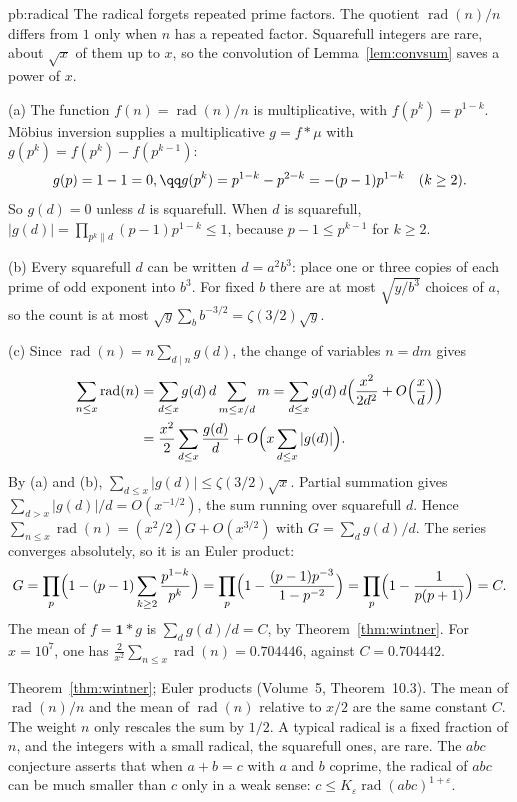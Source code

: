 \begin{solution}{pb:radical}
\idea The radical forgets repeated prime factors. The quotient $\operatorname{rad}(n)/n$ differs from $1$ only when $n$ has a repeated factor. Squarefull integers are rare, about $\sqrt x$ of them up to $x$, so the convolution of Lemma~\ref{lem:convsum} saves a power of $x$.

\writeup (a) The function $f(n)=\operatorname{rad}(n)/n$ is multiplicative, with $f(p^k)=p^{1-k}$. Möbius inversion supplies a multiplicative $g=f*\mu$ with $g(p^k)=f(p^k)-f(p^{k-1})$:
\[
g(p)=1-1=0,\qq g(p^k)=p^{1-k}-p^{2-k}=-(p-1)p^{1-k}\quad(k\ge2).
\]
So $g(d)=0$ unless $d$ is squarefull. When $d$ is squarefull, $|g(d)|=\prod_{p^k\parallel d}(p-1)p^{1-k}\le1$, because $p-1\le p^{k-1}$ for $k\ge2$.

(b) Every squarefull $d$ can be written $d=a^2b^3$: place one or three copies of each prime of odd exponent into $b^3$. For fixed $b$ there are at most $\sqrt{y/b^3}$ choices of $a$, so the count is at most $\sqrt y\sum_b b^{-3/2}=\zeta(3/2)\sqrt y$.

(c) Since $\operatorname{rad}(n)=n\sum_{d\mid n}g(d)$, the change of variables $n=dm$ gives
\[
\begin{aligned}\sum_{n\le x}\operatorname{rad}(n)&=\sum_{d\le x}g(d)\,d\sum_{m\le x/d}m=\sum_{d\le x}g(d)\,d\Bigl(\frac{x^2}{2d^2}+O\Bigl(\frac xd\Bigr)\Bigr)\\&=\frac{x^2}2\sum_{d\le x}\frac{g(d)}d+O\Bigl(x\sum_{d\le x}|g(d)|\Bigr).\end{aligned}
\]
By (a) and (b), $\sum_{d\le x}|g(d)|\le\zeta(3/2)\sqrt x$. Partial summation gives $\sum_{d>x}|g(d)|/d=O(x^{-1/2})$, the sum running over squarefull $d$. Hence $\sum_{n\le x}\operatorname{rad}(n)=(x^2/2)G+O(x^{3/2})$ with $G=\sum_d g(d)/d$. The series converges absolutely, so it is an Euler product:
\[
G=\prod_p\Bigl(1-(p-1)\sum_{k\ge2}\frac{p^{1-k}}{p^k}\Bigr)=\prod_p\Bigl(1-\frac{(p-1)p^{-3}}{1-p^{-2}}\Bigr)=\prod_p\Bigl(1-\frac1{p(p+1)}\Bigr)=C.
\]
The mean of $f=\mathbf1*g$ is $\sum_d g(d)/d=C$, by Theorem~\ref{thm:wintner}. For $x=10^7$, one has $\frac2{x^2}\sum_{n\le x}\operatorname{rad}(n)=0.704446$, against $C=0.704442$.

\tools Theorem~\ref{thm:wintner}; Euler products (Volume~5, Theorem~10.3).
\leads The mean of $\operatorname{rad}(n)/n$ and the mean of $\operatorname{rad}(n)$ relative to $x/2$ are the same constant $C$. The weight $n$ only rescales the sum by $1/2$. A typical radical is a fixed fraction of $n$, and the integers with a small radical, the squarefull ones, are rare. The $abc$ conjecture asserts that when $a+b=c$ with $a$ and $b$ coprime, the radical of $abc$ can be much smaller than $c$ only in a weak sense: $c\le K_\varepsilon\operatorname{rad}(abc)^{1+\varepsilon}$.
\end{solution}

